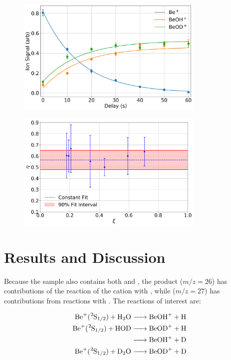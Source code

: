 \begin{figure}[H]
	\centering
	\includegraphics[width=0.8\textwidth]{images/Be_HOD_shared_fit.png}
	\caption{}
	\label{}
\end{figure}

\begin{figure}[H]
	\centering
	\includegraphics[width=0.8\textwidth]{images/Be_HOD_H_frac.png}
	\caption{}
	\label{}
\end{figure}

\section{Results and Discussion}

Because the  sample also contains both  and , the product  ($m/z = 26$) has contributions of the reaction of the cation with , while  ($m/z = 27$) has contributions from reactions with . The reactions of interest are:

\begin{align}
	\ce{Be+(^2S1/2) + H2O & -> BeOH+ + H} \\
	\ce{Be+(^2S1/2) + HOD & -> BeOD+ + H} \\
	\ce{& -> BeOH+ + D} \\
	\ce{Be+(^2S1/2) + D2O & -> BeOD+ + D}
\end{align}


